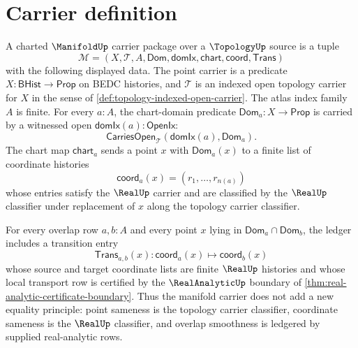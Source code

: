 \section{Carrier definition}
\label{sec:manifold-carrier}

\begin{definition}
\label{def:manifold-charted-carrier}
A charted $\ManifoldUp$ carrier package over a $\TopologyUp$ source is a tuple
$$
\mathcal{M}=(X,\mathcal{T},A,\mathsf{Dom},\mathsf{domIx},\mathsf{chart},\mathsf{coord},\mathsf{Trans})
$$
with the following displayed data. The point carrier is a predicate
$X:\mathsf{BHist}\to\mathsf{Prop}$ on BEDC histories, and
$\mathcal{T}$ is an indexed open topology carrier for $X$ in the sense of
\autoref{def:topology-indexed-open-carrier}. The atlas index family $A$ is
finite. For every $a:A$, the chart-domain predicate
$\mathsf{Dom}_a:X\to\mathsf{Prop}$ is carried by a witnessed open
$\mathsf{domIx}(a):\mathsf{OpenIx}$:
$$
\mathsf{CarriesOpen}_{\mathcal{T}}(\mathsf{domIx}(a),\mathsf{Dom}_a).
$$
The chart map $\mathsf{chart}_a$ sends a point $x$ with
$\mathsf{Dom}_a(x)$ to a finite list of coordinate histories
$$
\mathsf{coord}_a(x)=(r_1,\ldots,r_{n(a)})
$$
whose entries satisfy the $\RealUp$ carrier and are classified by the
$\RealUp$ classifier under replacement of $x$ along the topology carrier
classifier.

For every overlap row $a,b:A$ and every point $x$ lying in
$\mathsf{Dom}_a\cap\mathsf{Dom}_b$, the ledger includes a transition entry
$$
\mathsf{Trans}_{a,b}(x):
\mathsf{coord}_a(x)\longmapsto \mathsf{coord}_b(x)
$$
whose source and target coordinate lists are finite $\RealUp$ histories and
whose local transport row is certified by the $\RealAnalyticUp$ boundary of
\autoref{thm:real-analytic-certificate-boundary}. Thus the manifold carrier
does not add a new equality principle: point sameness is the topology carrier
classifier, coordinate sameness is the $\RealUp$ classifier, and overlap
smoothness is ledgered by supplied real-analytic rows.
\end{definition}

